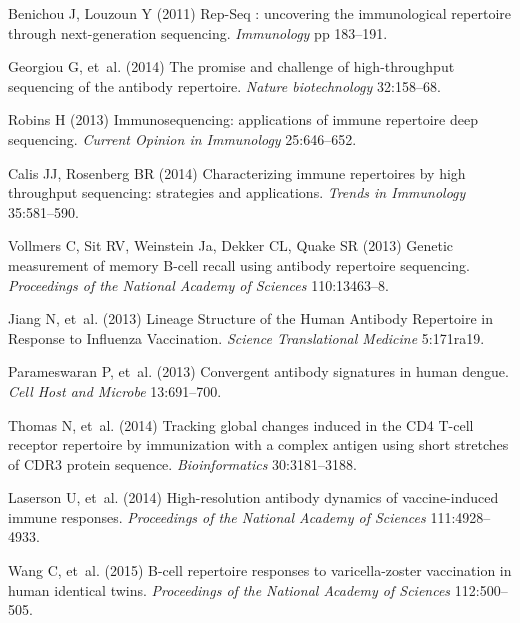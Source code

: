 \documentclass[pre,twocolumn,english,longbibliography]{revtex4}
\newcommand{\<}{\langle}
\renewcommand{\>}{\rangle}
\begin{document}

\begin{thebibliography}{10}

Benichou J, Louzoun Y
\newblock (2011) {Rep-Seq : uncovering the immunological repertoire through
  next-generation sequencing}.
\newblock \emph{Immunology} pp 183--191.

Georgiou G, {et~al.}
\newblock (2014) {The promise and challenge of high-throughput sequencing of
  the antibody repertoire.}
\newblock \emph{Nature biotechnology} 32:158--68.

Robins H
\newblock (2013) {Immunosequencing: applications of immune repertoire deep
  sequencing}.
\newblock \emph{Current Opinion in Immunology} 25:646--652.

Calis JJ, Rosenberg BR
\newblock (2014) {Characterizing immune repertoires by high throughput
  sequencing: strategies and applications}.
\newblock \emph{Trends in Immunology} 35:581--590.

Vollmers C, Sit RV, Weinstein Ja, Dekker CL, Quake SR
\newblock (2013) {Genetic measurement of memory B-cell recall using antibody
  repertoire sequencing.}
\newblock \emph{Proceedings of the National Academy of Sciences} 110:13463--8.

Jiang N, {et~al.}
\newblock (2013) {Lineage Structure of the Human Antibody Repertoire in
  Response to Influenza Vaccination}.
\newblock \emph{Science Translational Medicine} 5:171ra19.

Parameswaran P, {et~al.}
\newblock (2013) {Convergent antibody signatures in human dengue}.
\newblock \emph{Cell Host and Microbe} 13:691--700.

Thomas N, {et~al.}
\newblock (2014) {Tracking global changes induced in the CD4 T-cell receptor
  repertoire by immunization with a complex antigen using short stretches of
  CDR3 protein sequence}.
\newblock \emph{Bioinformatics} 30:3181--3188.

Laserson U, {et~al.}
\newblock (2014) {High-resolution antibody dynamics of vaccine-induced immune
  responses}.
\newblock \emph{Proceedings of the National Academy of Sciences}
  111:4928--4933.

Wang C, {et~al.}
\newblock (2015) {B-cell repertoire responses to varicella-zoster vaccination
  in human identical twins}.
\newblock \emph{Proceedings of the National Academy of Sciences} 112:500--505.


\end{thebibliography}
\end{document}

